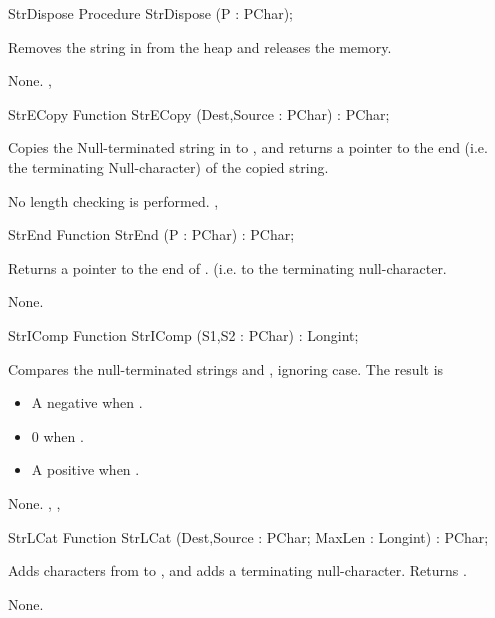\html{}
\begin{procedure}{StrDispose}
\Declaration
Procedure StrDispose (P : PChar);

\Description

Removes the string in  from the heap and releases the memory.

\Errors
None.
\SeeAlso
{}, 
\end{procedure}
\html{}
\begin{function}{StrECopy}
\Declaration
Function StrECopy (Dest,Source : PChar) : PChar;

\Description

Copies the Null-terminated string in  to , and
returns a pointer to the end (i.e. the terminating Null-character) of the
copied string.

\Errors
No length checking is performed.
\SeeAlso
{}, 
\end{function}
\html{}
\begin{function}{StrEnd}
\Declaration
Function StrEnd (P : PChar) : PChar;

\Description

Returns a pointer to the end of . (i.e. to the terminating
null-character.

\Errors
None.
\SeeAlso
{}
\end{function}
\html{}
\begin{function}{StrIComp}
\Declaration
Function StrIComp (S1,S2 : PChar) : Longint;

\Description

Compares the null-terminated strings  and , ignoring case.
The result is 
\begin{itemize}
\item A negative  when .
\item 0 when .
\item A positive  when .
\end{itemize}

\Errors
None.
\SeeAlso
{}, , 
\end{function}
\html{}
\begin{function}{StrLCat}
\Declaration
Function StrLCat (Dest,Source : PChar; MaxLen : Longint) : PChar;

\Description

Adds  characters from  to , and adds a
terminating null-character. Returns .

\Errors
None.
\SeeAlso
{}
\end{function}
